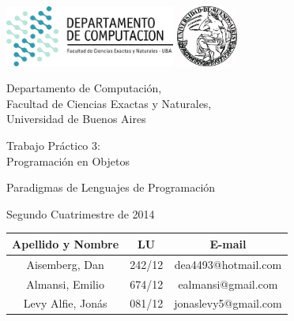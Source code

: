 \documentclass[a4paper, 10pt, twoside]{article}
\begin{document}


\thispagestyle{caratula}

\begin{center}

\includegraphics[height=2cm]{DC.png} 
\hfill
\includegraphics[height=2cm]{UBA.jpg} 

\vspace{2cm}

Departamento de Computación,\\
Facultad de Ciencias Exactas y Naturales,\\
Universidad de Buenos Aires

\vspace{4cm}

\begin{Huge}
Trabajo Práctico 3: \\
Programación en Objetos
\end{Huge}

\vspace{0.5cm}

\begin{Large}
Paradigmas de Lenguajes de Programación
\end{Large}

\vspace{1cm}

Segundo Cuatrimestre de 2014

\vspace{4cm}

\begin{tabular}{|c|c|c|}
\hline
Apellido y Nombre & LU & E-mail\\
\hline
Aisemberg, Dan & 242/12 & dea4493@hotmail.com \\
Almansi, Emilio & 674/12 & ealmansi@gmail.com \\
Levy Alfie, Jon\'as & 081/12 & jonaslevy5@gmail.com \\
\hline
\end{tabular}

\end{center}
\end{document}
